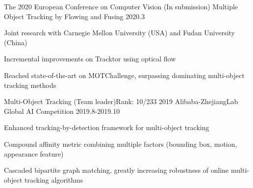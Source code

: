 
\begin{cventries}
 \cventry
    {The 2020 European Conference on Computer Vision (In submission)} %
    {Multiple Object Tracking by Flowing and Fusing} %
    {} %
    {2020.3} %
    {
        \begin{cvitems}
            \item {Joint research with Carnegie Mellon University (USA) and Fudan University (China)}
            \item {Incremental improvements on Tracktor using optical flow}
            \item {Reached state-of-the-art on MOTChallenge, surpassing dominating multi-object tracking methods}
        \end{cvitems}
    }

  \cventry
    {Multi-Object Tracking (Team leader)\quad Rank: 10/233} %
    {2019 Alibaba-ZhejiangLab Global AI Competition} %
    {} %
    {2019.8-2019.10} %
    {
        \begin{cvitems}
            \item {Enhanced tracking-by-detection framework for multi-object tracking}
            \item {Compound affinity metric combining multiple factors (bounding box, motion, appearance feature)}
            \item {Cascaded bipartite graph matching, greatly increasing robustness of online multi-object tracking algorithms}
        \end{cvitems}
    }

\end{cventries}
